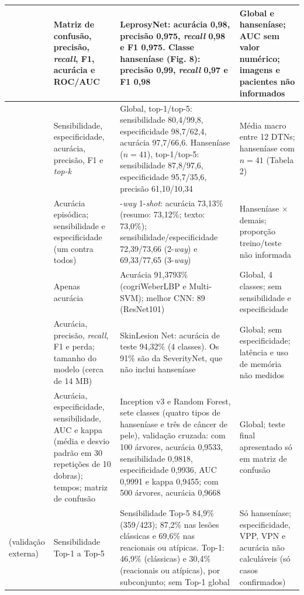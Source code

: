 \begin{longtable}{|>{\raggedright\arraybackslash}p{1.3cm}|>{\raggedright\arraybackslash}p{3.3cm}|>{\raggedright\arraybackslash}p{6.6cm}|>{\raggedright\arraybackslash}p{3.8cm}|}
	\estudo{E14} & Matriz de confusão, precisão, \textit{recall}, F1, acurácia e ROC/AUC & LeprosyNet: acurácia 0,98, precisão 0,975, \textit{recall} 0,98 e F1 0,975. Classe hanseníase (Fig. 8): precisão 0,99, \textit{recall} 0,97 e F1 0,98 & Global e hanseníase; AUC sem valor numérico; imagens e pacientes não informados \\ \hline
	\estudo{E15} & Sensibilidade, especificidade, acurácia, precisão, F1 e \textit{top-k} & Global, top-1/top-5: sensibilidade 80,4/99,8, especificidade 98,7/62,4, acurácia 97,7/66,6. Hanseníase ($n=41$), top-1/top-5: sensibilidade 87,8/97,6, especificidade 95,7/35,6, precisão 61,10/10,34 & Média macro entre 12 DTNs; hanseníase com $n=41$ (Tabela 2) \\ \hline
	\estudo{E17} & Acurácia episódica; sensibilidade e especificidade (um contra todos) & 2-\textit{way} 1-\textit{shot}: acurácia 73,13\% (resumo: 73,12\%; texto: 73,0\%); sensibilidade/especificidade 72,39/73,66 (2-\textit{way}) e 69,33/77,65 (3-\textit{way}) & Hanseníase $\times$ demais; proporção treino/teste não informada \\ \hline
	\estudo{E25} & Apenas acurácia & Acurácia 91,3793\% (cogriWeberLBP e Multi-SVM); melhor CNN: 89 (ResNet101) & Global, 4 classes; sem sensibilidade e especificidade \\ \hline
	\estudo{E24} & Acurácia, precisão, \textit{recall}, F1 e perda; tamanho do modelo (cerca de 14 MB) & SkinLesion Net: acurácia de teste 94,32\% (4 classes). Os 91\% são da SeverityNet, que não inclui hanseníase & Global; sem especificidade; latência e uso de memória não medidos \\ \hline
	\estudo{E26} & Acurácia, especificidade, sensibilidade, AUC e kappa (média e desvio padrão em 30 repetições de 10 dobras); tempos; matriz de confusão & Inception v3 e Random Forest, sete classes (quatro tipos de hanseníase e três de câncer de pele), validação cruzada: com 100 árvores, acurácia 0,9533, sensibilidade 0,9818, especificidade 0,9936, AUC 0,9991 e kappa 0,9455; com 500 árvores, acurácia 0,9668 & Global; teste final apresentado só em matriz de confusão \\ \hline
	\estudo{E04} (validação externa) & Sensibilidade Top-1 a Top-5 & Sensibilidade Top-5 84,9\% (359/423); 87,2\% nas lesões clássicas e 69,6\% nas reacionais ou atípicas. Top-1: 46,9\% (clássicas) e 30,4\% (reacionais ou atípicas), por subconjunto; sem Top-1 global & Só hanseníase; especificidade, VPP, VPN e acurácia não calculáveis (só casos confirmados) \\ \hline
\end{longtable}
\endgroup
{}

